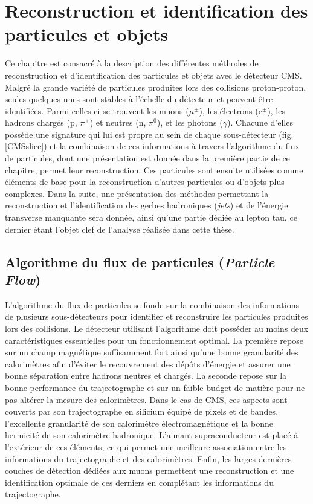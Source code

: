 \chapter{Reconstruction et identification des particules et objets}
\label{chap5}

Ce chapitre est consacré à la description des différentes méthodes de reconstruction et d'identification des particules et objets avec le détecteur CMS. Malgré la grande variété de particules produites lors des collisions proton-proton, seules quelques-unes sont stables à l'échelle du détecteur et peuvent être identifiées. Parmi celles-ci se trouvent les muons ($\mu^{\pm}$), les électrons (e$^{\pm}$), les hadrons chargés (p, $\pi^{\pm}$) et neutres (n, $\pi^0$), et les photons ($\gamma$). Chacune d'elles possède une signature qui lui est propre au sein de chaque sous-détecteur (fig. \ref{CMSslice}) et la combinaison de ces informations à travers l'algorithme du flux de particules, dont une présentation est donnée dans la première partie de ce chapitre, permet leur reconstruction.
Ces particules sont ensuite utilisées comme éléments de base pour la reconstruction d'autres particules ou d'objets plus complexes. Dans la suite, une présentation des méthodes permettant la reconstruction et l'identification des gerbes hadroniques (\textit{jets}) et de l'énergie transverse manquante sera donnée, ainsi qu'une partie dédiée au lepton tau, ce dernier étant l'objet clef de l'analyse réalisée dans cette thèse. 

\section{Algorithme du flux de particules (\textit{Particle Flow})}
\label{PF}

L'algorithme du flux de particules \cite{ThePFAlgo} se fonde sur la combinaison des informations de plusieurs sous-détecteurs pour identifier et reconstruire les particules produites lors des collisions. Le détecteur utilisant l'algorithme doit posséder au moins deux caractéristiques essentielles pour un fonctionnement optimal. La première repose sur un champ magnétique suffisamment fort ainsi qu'une bonne granularité des calorimètres afin d'éviter le recouvrement des dépôts d'énergie et assurer une bonne séparation entre hadrons neutres et chargés. La seconde repose sur la bonne performance du trajectographe et sur un faible budget de matière pour ne pas altérer la mesure des calorimètres. Dans le cas de CMS, ces aspects sont couverts par son trajectographe en silicium équipé de pixels et de bandes, l'excellente granularité de son calorimètre électromagnétique et la bonne hermicité de son calorimètre hadronique. L'aimant supraconducteur est placé à l'extérieur de ces éléments, ce qui permet une meilleure association entre les informations du trajectographe et des calorimètres. Enfin, les larges dernières couches de détection dédiées aux muons permettent une reconstruction et une identification optimale de ces derniers en complétant les informations du trajectographe. \\

